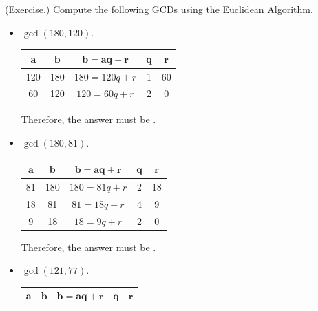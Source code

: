 \documentclass[letterpaper]{article}
\newcommand{\0}{\mathbf{0}}
\begin{document}
\begin{mdframed}
    (Exercise.) Compute the following GCDs using the Euclidean Algorithm.

    \begin{itemize}
        \item $\gcd(180, 120).$
        \begin{mdframed}
            \begin{center}
                \begin{tabular}{|c|c|c|c|c|}
                    \hline 
                    $\mathbf{a}$ & $\mathbf{b}$ & $\mathbf{b = aq + r}$ & $\mathbf{q}$ & $\mathbf{r}$ \\ 
                    \hline 
                    120 & 180 & $180 = 120q + r$ & 1   & 60 \\ 
                    60  & 120 & $120 = 60q + r$  & 2   & 0  \\ 
                    \hline 
                \end{tabular}
            \end{center}
            Therefore, the answer must be .
        \end{mdframed}
        \item $\gcd(180, 81).$
        \begin{mdframed}
            \begin{center}
                \begin{tabular}{|c|c|c|c|c|}
                    \hline 
                    $\mathbf{a}$ & $\mathbf{b}$ & $\mathbf{b = aq + r}$ & $\mathbf{q}$ & $\mathbf{r}$ \\ 
                    \hline 
                    81 & 180 & $180 = 81q + r$ & 2 & 18 \\ 
                    18 & 81 & $81 = 18q + r$ & 4 & 9 \\ 
                    9 & 18 & $18 = 9q + r$ & 2 & 0 \\ 
                    \hline 
                \end{tabular}
            \end{center}
            Therefore, the answer must be .
        \end{mdframed}
        \item $\gcd(121, 77).$
        \begin{mdframed}
            \begin{center}
                \begin{tabular}{|c|c|c|c|c|}
                    \hline 
                    $\mathbf{a}$ & $\mathbf{b}$ & $\mathbf{b = aq + r}$ & $\mathbf{q}$ & $\mathbf{r}$ \\ 

\end{tabular}
\end{center}
\end{mdframed}
\end{itemize}
\end{mdframed}
\end{document}

